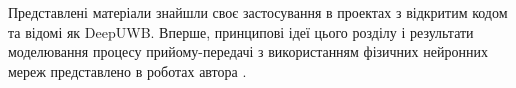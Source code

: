 





Представлені матеріали знайшли своє застосування в проектах з 
відкритим кодом та відомі як DeepUWB. Вперше, принципові ідеї 
цього розділу і результати моделювання процесу прийому-передачі 
з використанням фізичних нейронних мереж  представлено в 
роботах автора \cite{my:Telecom2018, my:UKRCON2019, 
my:TKEA2020, my:UKRCON2020}. 

